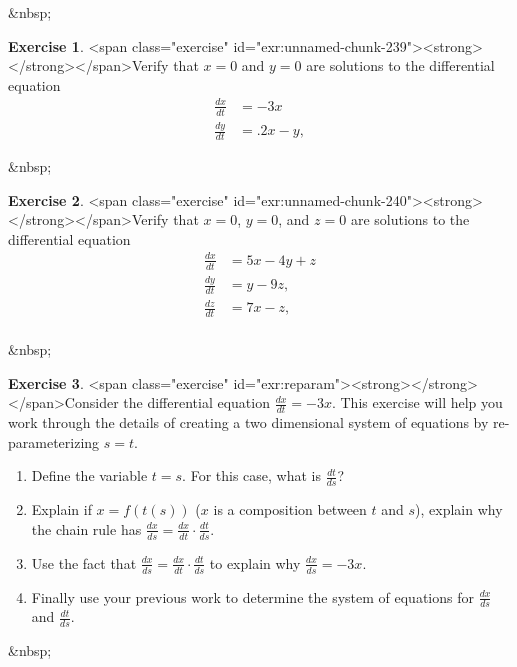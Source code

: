 \documentclass[
]{book}
\theoremstyle{definition}
\theoremstyle{definition}
\theoremstyle{definition}
\newtheorem{exercise}{Exercise}[chapter]
\theoremstyle{remark}
\begin{document}
&nbsp;


\begin{exercise}
<span class="exercise" id="exr:unnamed-chunk-239"><strong>\label{exr:unnamed-chunk-239} </strong></span>Verify that $x=0$ and $y=0$ are solutions to the differential equation
\begin{equation}
\begin{split}
\frac{dx}{dt} &= -3x \\ 
\frac{dy}{dt} &= .2x-y,
\end{split}
\end{equation}
\end{exercise}

&nbsp;

\begin{exercise}
<span class="exercise" id="exr:unnamed-chunk-240"><strong>\label{exr:unnamed-chunk-240} </strong></span>Verify that $x=0$, $y=0$, and $z=0$ are solutions to the differential equation
\begin{equation}
\begin{split}
\frac{dx}{dt} &= 5x-4y + z \\ 
\frac{dy}{dt} &= y - 9z, \\
\frac{dz}{dt} &= 7x-z, \\
\end{split}
\end{equation}
\end{exercise}

&nbsp;

\begin{exercise}
<span class="exercise" id="exr:reparam"><strong>\label{exr:reparam} </strong></span>Consider the differential equation $\displaystyle \frac{dx}{dt} = -3x$. This exercise will help you work through the details of creating a two dimensional system of equations by re-parameterizing $s=t$.

\begin{enumerate}[label=\alph*.]
\item Define the variable $t = s$.  For this case, what is $\displaystyle \frac{dt}{ds}$?
\item Explain if $ x = f (t (s))$ ($x$ is a composition between $t$ and $s$), explain why the chain rule has $\displaystyle \frac{dx}{ds} = \frac{dx}{dt} \cdot \frac{dt}{ds}$.
\item Use the fact that $\displaystyle \frac{dx}{ds} = \frac{dx}{dt} \cdot \frac{dt}{ds}$ to explain why $\displaystyle \frac{dx}{ds} = -3x$.
\item Finally use your previous work to determine the system of equations for $\displaystyle \frac{dx}{ds}$ and $\displaystyle \frac{dt}{ds}$.
\end{enumerate}
\end{exercise}
&nbsp;
\end{document}

